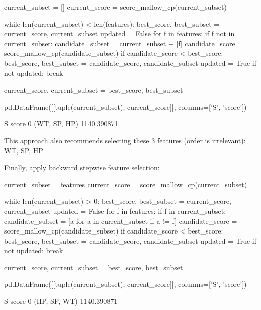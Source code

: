 \begin{python}
current_subset = []
current_score = score_mallow_cp(current_subset)

while len(current_subset) < len(features):
    best_score, best_subset = current_score, current_subset
    updated = False
    for f in features:
        if f not in current_subset:
            candidate_subset = current_subset + [f]
            candidate_score = score_mallow_cp(candidate_subset)
            if candidate_score < best_score:
                best_score, best_subset = candidate_score, candidate_subset
                updated = True              
    if not updated:
        break
        
    current_score, current_subset = best_score, best_subset
    
pd.DataFrame([[tuple(current_subset), current_score]], columns=['S', 'score'])
\end{python}

\begin{console}
              S        score
0  (WT, SP, HP)  1140.390871
\end{console}

This approach also recommends selecting these 3 features (order is
irrelevant): WT, SP, HP

Finally, apply backward stepwise feature selection:

\begin{python}
current_subset = features
current_score = score_mallow_cp(current_subset)

while len(current_subset) > 0:
    best_score, best_subset = current_score, current_subset
    updated = False
    for f in features:
        if f in current_subset:
            candidate_subset = [a for a in current_subset if a != f]
            candidate_score = score_mallow_cp(candidate_subset)
            if candidate_score < best_score:
                best_score, best_subset = candidate_score, candidate_subset
                updated = True              
    if not updated:
        break
        
    current_score, current_subset = best_score, best_subset
    
pd.DataFrame([[tuple(current_subset), current_score]], columns=['S', 'score'])
\end{python}

\begin{console}
              S        score
0  (HP, SP, WT)  1140.390871
\end{console}


